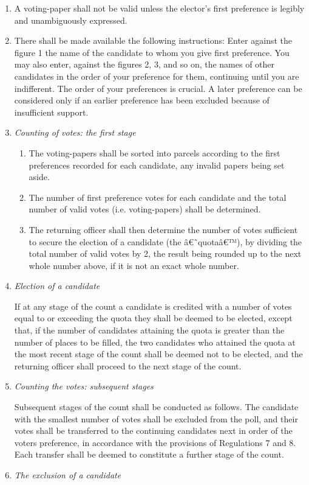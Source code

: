 \documentclass{article}
\begin{document}
\begin{enumerate}
\item A voting-paper shall not be valid unless the elector's first preference is
legibly and unambiguously expressed.
\item There shall be made available the following instructions:
Enter against the figure 1 the name of the candidate to whom you give
first preference.
You may also enter, against the figures 2, 3, and so on, the names of other
candidates in the order of your preference for them, continuing until you
are indifferent. The order of your preferences is crucial. A later preference
can be considered only if an earlier preference has been excluded because
of insufficient support.
\item \textit{Counting of votes: the first stage}
  \begin{enumerate}
  \item The voting-papers shall be sorted into parcels according to the first
  preferences recorded for each candidate, any invalid papers being set
  aside.
  \item The number of first preference votes for each candidate and the total
  number of valid votes (i.e. voting-papers) shall be determined.
  \item The returning officer shall then determine the number of votes sufficient to secure the election of a candidate (the â€˜quotaâ€™), by dividing
  the total number of valid votes by 2, the result being rounded up to
  the next whole number above, if it is not an exact whole number.
  \end{enumerate}
\item \textit{Election of a candidate}

If at any stage of the count a candidate is credited with a number of votes
equal to or exceeding the quota they shall be deemed to be elected,
except that, if the number of candidates attaining the quota is greater
than the number of places to be filled, the two candidates who attained
the quota at the most recent stage of the count shall be deemed not to
be elected, and the returning officer shall proceed to the next stage of the
count.
\item \textit{Counting the votes: subsequent stages}

Subsequent stages of the count shall be conducted as follows. The candidate with the smallest number of votes shall be excluded from the poll,
and their votes shall be transferred to the continuing candidates next
in order of the voters preference, in accordance with the provisions of Regulations 7 and 8. Each transfer shall be deemed to constitute a further
stage of the count.
\item \textit{The exclusion of a candidate}


\end{enumerate}
\end{document}
